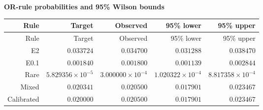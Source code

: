 
\begingroup\small
\setlength{\tabcolsep}{4pt}
\noindent\textbf{OR-rule probabilities and 95\% Wilson bounds}
\begin{longtable}{rrrrr}
\toprule
Rule & Target & Observed & 95\% lower & 95\% upper \\
\midrule
\endfirsthead
Rule & Target & Observed & 95\% lower & 95\% upper \\
\midrule
\endhead
\bottomrule
\endfoot
E2 & $0.033724$ & $0.034700$ & $0.031288$ & $0.038470$ \\
E0.1 & $0.001840$ & $0.001800$ & $0.001139$ & $0.002844$ \\
Rare & $5.829356\times10^{-5}$ & $3.000000\times10^{-4}$ & $1.020322\times10^{-4}$ & $8.817358\times10^{-4}$ \\
Mixed & $0.020341$ & $0.020500$ & $0.017901$ & $0.023467$ \\
Calibrated & $0.020000$ & $0.020500$ & $0.017901$ & $0.023467$ \\
\end{longtable}
\endgroup
